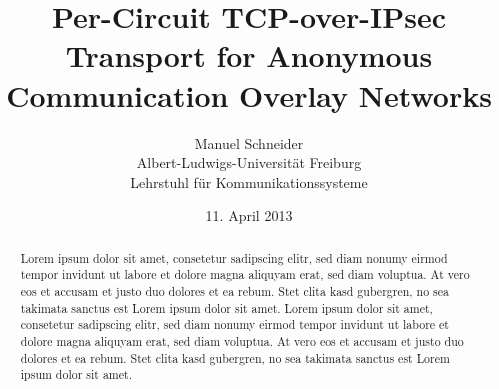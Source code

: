 \subject{Ausarbeitung zum Seminar}
\title{Per-Circuit TCP-over-IPsec Transport for Anonymous Communication Overlay Networks} 
\author{Manuel Schneider\\Albert-Ludwigs-Universität Freiburg\\Lehrstuhl für Kommunikationssysteme} 
\date{11. April 2013} 
\maketitle 
\thispagestyle{empty}
\begin{abstract}
Lorem ipsum dolor sit amet, consetetur sadipscing elitr, sed diam nonumy eirmod tempor invidunt ut labore et dolore magna aliquyam erat, sed diam voluptua. At vero eos et accusam et justo duo dolores et ea rebum. Stet clita kasd gubergren, no sea takimata sanctus est Lorem ipsum dolor sit amet. Lorem ipsum dolor sit amet, consetetur sadipscing elitr, sed diam nonumy eirmod tempor invidunt ut labore et dolore magna aliquyam erat, sed diam voluptua. At vero eos et accusam et justo duo dolores et ea rebum. Stet clita kasd gubergren, no sea takimata sanctus est Lorem ipsum dolor sit amet.
\end{abstract}
\newpage